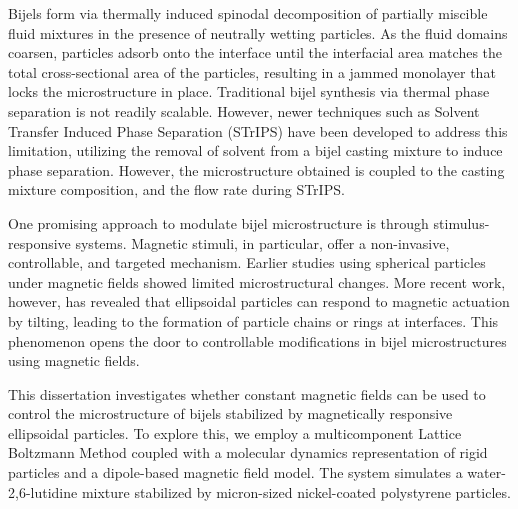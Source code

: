 \begin{front}
    Bijels form via thermally induced spinodal decomposition of partially miscible fluid mixtures in the presence of neutrally 
    wetting particles. As the fluid domains coarsen, particles adsorb onto the interface until the interfacial area matches the 
    total cross-sectional area of the particles, resulting in a jammed monolayer that locks the microstructure in place. Traditional 
    bijel synthesis via thermal phase separation is not readily scalable. However, newer techniques such as Solvent Transfer Induced 
    Phase Separation (STrIPS) have been developed to address this limitation, utilizing the removal of solvent from a bijel casting
    mixture to induce phase separation. However, the microstructure obtained is coupled to the casting mixture composition, 
    and the flow rate during STrIPS.
    
    One promising approach to modulate bijel microstructure is through stimulus-responsive systems. Magnetic stimuli, in particular, 
    offer a non-invasive, controllable, and targeted mechanism. Earlier studies using spherical particles under magnetic fields showed 
    limited microstructural changes. More recent work, however, has revealed that ellipsoidal particles can respond to magnetic actuation 
    by tilting, leading to the formation of particle chains or rings at interfaces. This phenomenon opens the door to controllable 
    modifications in bijel microstructures using magnetic fields.
    
    This dissertation investigates whether constant magnetic fields can be used to control the microstructure of bijels stabilized by 
    magnetically responsive ellipsoidal particles. To explore this, we employ a multicomponent Lattice Boltzmann Method coupled with a 
    molecular dynamics representation of rigid particles and a dipole-based magnetic field model. The system simulates a water-2,6-lutidine 
    mixture stabilized by micron-sized nickel-coated polystyrene particles.
    

\end{front}
